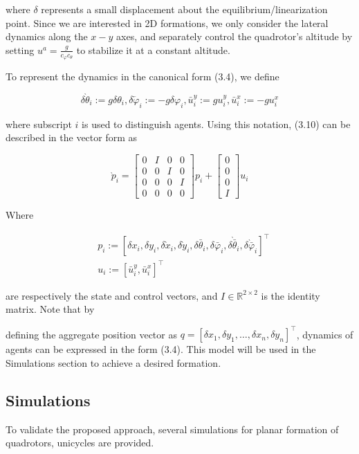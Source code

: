 \documentclass[10pt]{article}
\begin{document}
where $\delta$ represents a small displacement about the equilibrium/linearization point. Since we are interested in 2D formations, we only consider the lateral dynamics along the $x-y$ axes, and separately control the quadrotor's altitude by setting $u^{a}=\frac{g}{c_{\varphi} c_{\theta}}$ to stabilize it at a constant altitude.

To represent the dynamics in the canonical form (3.4), we define

$$
\delta \grave{\theta}_{i}:=g \delta \theta_{i}, \delta \overleftarrow{\varphi}_{i}:=-g \delta \varphi_{i}, \bar{u}_{i}^{y}:=g u_{i}^{y}, \bar{u}_{i}^{x}:=-g u_{i}^{x}
$$

where subscript $i$ is used to distinguish agents. Using this notation, (3.10) can be described in the vector form as

$$
\grave{p}_{i}=\left[\begin{array}{cccc}
0 & I & 0 & 0 \\
0 & 0 & I & 0 \\
0 & 0 & 0 & I \\
0 & 0 & 0 & 0
\end{array}\right] p_{i}+\left[\begin{array}{l}
0 \\
0 \\
0 \\
I
\end{array}\right] u_{i}
$$

Where

$$
\begin{aligned}
& p_{i}:=\left[\delta x_{i}, \delta y_{i}, \delta \grave{x}_{i}, \delta \grave{y}_{i}, \delta \bar{\theta}_{i}, \delta \bar{\varphi}_{i}, \delta \grave{\bar{\theta}}_{i}, \delta \grave{\bar{\varphi}}_{i}\right]^{\top} \\
& u_{i}:=\left[\bar{u}_{i}^{y}, \bar{u}_{i}^{x}\right]^{\top}
\end{aligned}
$$

are respectively the state and control vectors, and $I \in \mathbb{R}^{2 \times 2}$ is the identity matrix. Note that by

defining the aggregate position vector as $q=\left[\delta x_{1}, \delta y_{1}, \ldots, \delta x_{n}, \delta y_{n}\right]^{\top}$, dynamics of agents can be expressed in the form (3.4). This model will be used in the Simulations section to achieve a desired formation.

\subsection{Simulations}
To validate the proposed approach, several simulations for planar formation of quadrotors, unicycles are provided.
\end{document}
